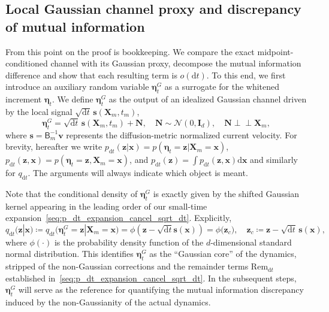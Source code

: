 \documentclass[
 longbibliography,
 twocolumn,
 superscriptaddress,
 amsmath,
 amssymb,
 amsthm,
 amsfonts,
 prl,
 floatfix,
]{revtex4-2}
\newcommand{\matbf}[1]{\boldsymbol{\mathsf{#1}}}
\begin{document}
\begin{widetext}
\subsection{Local Gaussian channel proxy and discrepancy of mutual information}
\vspace*{-0.6\baselineskip}
From this point on the proof is bookkeeping. We compare the exact midpoint-conditioned channel with its Gaussian proxy, decompose the mutual information difference and show that each resulting term is $o(\mathrm dt)$.
To this end, we first introduce an auxiliary random variable $\bm\eta_t^G$ as a surrogate for the whitened increment $\bm\eta_t$.
We define $\bm\eta_t^G$ as the output of an idealized Gaussian channel driven by the local signal $\sqrt{\mathrm dt}\,\bm s(\bm X_m,t_m)$,
\begin{equation}
    \bm\eta_t^G=\sqrt{\mathrm dt}\,\bm s(\bm X_m,t_m)+\bm N,
    \quad
    \bm N\sim\mathcal N(0,\mathbf I_d),
    \quad\bm N\perp\!\!\!\perp\bm X_m,
    \label{seq:Gaussian_channel_proxy}
\end{equation}
where $\bm s=\matbf B_m^{-1}\bm v$ represents the diffusion-metric normalized current velocity.
For brevity, hereafter we write $p_{\mathrm dt}(\bm z|\bm x)=p(\bm\eta_t=\bm z|\bm X_m=\bm x)$, $p_{\mathrm dt}(\bm z,\bm x)=p(\bm\eta_t=\bm z,\bm X_m=\bm x)$, and $p_{\mathrm dt}(\bm z)=\int p_{\mathrm dt}(\bm z,\bm x)\mathrm d\bm x$ and similarly for $q_{\mathrm dt}$. The arguments will always indicate which object is meant.

Note that the conditional density of $\bm\eta_t^G$ is exactly given by the shifted Gaussian kernel appearing in the leading order of our small-time expansion~\eqref{seq:p_dt_expansion_cancel_sqrt_dt}. Explicitly,
\begin{equation}
    q_{\mathrm dt}(\bm z|\bm x)\coloneq
    q_{\mathrm dt}\big(\bm\eta_t^G=\bm z|\bm X_m=\bm x\big) 
    = \phi\!\left(\bm z - \sqrt{\mathrm dt}\bm s(\bm x)\right) 
    = \phi\big(\bm z_c\big),
    \quad
    \bm z_c\coloneq\bm z-\sqrt{\mathrm dt}\,\bm s(\bm x),
    \label{seq:q_dt_equal_phi}
\end{equation}
where $\phi(\cdot)$ is the probability density function of the $d$-dimensional standard normal distribution. This identifies $\bm\eta_t^G$ as the ``Gaussian core'' of the dynamics, stripped of the non-Gaussian corrections and the remainder terms $\mathrm{Rem}_{\mathrm dt}$ established in~\eqref{seq:p_dt_expansion_cancel_sqrt_dt}. In the subsequent steps, $\bm\eta_t^G$ will serve as the reference for quantifying the mutual information discrepancy induced by the non-Gaussianity of the actual dynamics.


\end{widetext}
\end{document}
